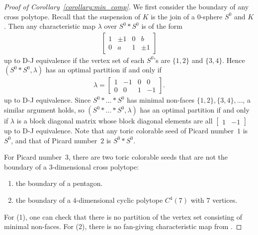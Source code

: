 \documentclass[11pt]{amsart}
\theoremstyle{plain}
\numberwithin{equation}{section}
\theoremstyle{definition}
\begin{document}
\begin{proof}[Proof of Corollary~\ref{corollary:min_comp}]
 	We first consider the boundary of any cross polytope.
	Recall that the suspension of $K$ is the join of a $0$-sphere $S^0$ and $K$.
	Then any characteristic map $\lambda$ over $S^0 \ast S^0$ is of the form
	\begin{align*}
		\begin{bmatrix}
			1 & \pm 1 & 0 & b \\
			0 & a & 1 & \pm 1
		\end{bmatrix}
	\end{align*} up to D-J equivalence if the vertex set of each $S^0$'s are $\{1, 2\}$ and $\{3, 4\}$.
	Hence $(S^0 \ast S^0, \lambda)$ has an optimal partition if and only if
	\begin{align*}
		\lambda = \begin{bmatrix}
			1 & -1 & 0 & 0 \\
			0 & 0 & 1 & -1
		\end{bmatrix}.
	\end{align*} up to D-J equivalence.
	Since $S^0 \ast \dots \ast S^0$ has minimal non-faces $\{1,2\}, \{3,4\}, \ldots$, a similar argument holds, so $(S^0 \ast \dots \ast S^0, \lambda)$
	has an optimal partition if and only if $\lambda$ is a block diagonal matrix whose block diagonal elements are all $\begin{bmatrix}
		1 & -1
	\end{bmatrix}$
	up to D-J equivalence.
	Note that any toric colorable seed of Picard number~$1$ is $S^0$, and that of Picard number~$2$ is $S^0 \ast S^0$.
	
	For Picard number~$3$, there are two toric colorable seeds that are not the boundary of a $3$-dimensional cross polytope:
	\begin{enumerate}
		\item the boundary of a pentagon.
		\item the boundary of a $4$-dimensional cyclic polytope $C^4(7)$ with $7$ vertices.
	\end{enumerate}
	For (1), one can check that there is no partition of the vertex set consisting of minimal non-faces.
	For (2), there is no fan-giving characteristic map from \cite{Choi-Park2016}.
	

\end{proof}
\end{document}
